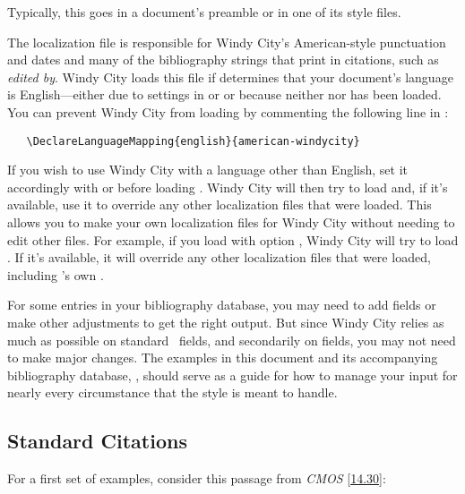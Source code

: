 \documentclass[11pt,letterpaper,oneside]{article}
\begin{document}
\noindent Typically, this goes in a document's preamble or in one of
its style files.

The localization file  is responsible for
Windy City's American-style punctuation and dates and many of the
bibliography strings that print in citations, such as \textit{edited
by}. Windy City loads this file if \biblatex determines that your
document's language is English---either due to settings in \babel or
\polyglossia or because neither \babel nor \polyglossia has been
loaded. You can prevent Windy City from loading
 by commenting the following line in
:

\begin{verbatim}
   \DeclareLanguageMapping{english}{american-windycity}
\end{verbatim}

If you wish to use Windy City with a language other than English, set
it accordingly with \babel or \polyglossia before loading \biblatex.
Windy City will then try to load  and,
if it's available, use it to override any other localization files
that were loaded. This allows you to make your own localization files
for Windy City without needing to edit other files. For example, if
you load \babel with option , Windy City will try to load
. If it's available, it will override any
other localization files that were loaded, including \biblatex's own
.

For some entries in your bibliography database, you may need to add
fields or make other adjustments to get the right output. But since
Windy City relies as much as possible on standard \BibTeX\ fields, and
secondarily on \biblatex fields, you may not need to make major
changes. The examples in this document and its accompanying
bibliography database, , should serve as a guide
for how to manage your input for nearly every circumstance that the
style is meant to handle.

\subsection{Standard Citations}
\label{standard}

For a first set of examples, consider this passage from \textit{CMOS}
\ref{14.30}:

\begin{citeonly}
\item \cite[24--25]{morley1995}
\item \cite{schwartz1992}
\item \cite{kaiser1964}
\item \cite[43]{morley1995}
\item \cite[138]{schwartz1992}
\item \cite[189--90]{kaiser1964}
\end{citeonly}
\end{document}
